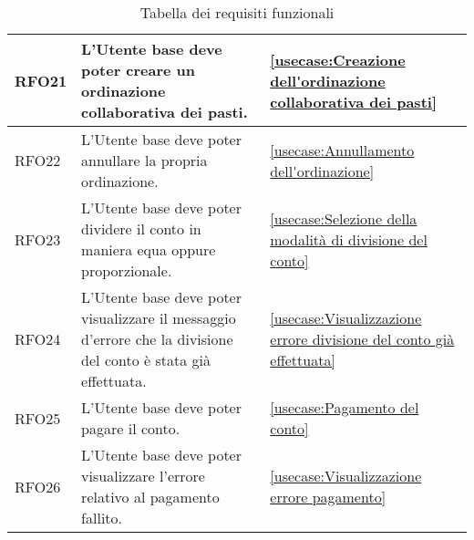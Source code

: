 \begin{table}[H]
\begin{tabularx}{\textwidth}{l|X|p{2cm}}
		\hline
		RFO21       & L'Utente base deve poter creare un ordinazione collaborativa dei pasti.                                        & \autoref{usecase:Creazione dell'ordinazione collaborativa dei pasti}                                               \\
		\hline
		RFO22       & L'Utente base deve poter annullare la propria ordinazione.                                                     & \autoref{usecase:Annullamento dell'ordinazione}                                                                    \\
		\hline
		RFO23       & L'Utente base deve poter dividere il conto in maniera equa oppure proporzionale.                               & \autoref{usecase:Selezione della modalità di divisione del conto}                                                  \\
		\hline
		RFO24       & L'Utente base deve poter visualizzare il messaggio d'errore che la divisione del conto è stata già effettuata. & \autoref{usecase:Visualizzazione errore divisione del conto già effettuata}                                        \\
		\hline
		RFO25       & L'Utente base deve poter pagare il conto.                                                                      & \autoref{usecase:Pagamento del conto}                                                                              \\
		\hline
		RFO26       & L'Utente base deve poter visualizzare l'errore relativo al pagamento fallito.                                  & \autoref{usecase:Visualizzazione errore pagamento}                                                                 \\
	\end{tabularx}
	\caption{Tabella dei requisiti funzionali}
\end{table}



